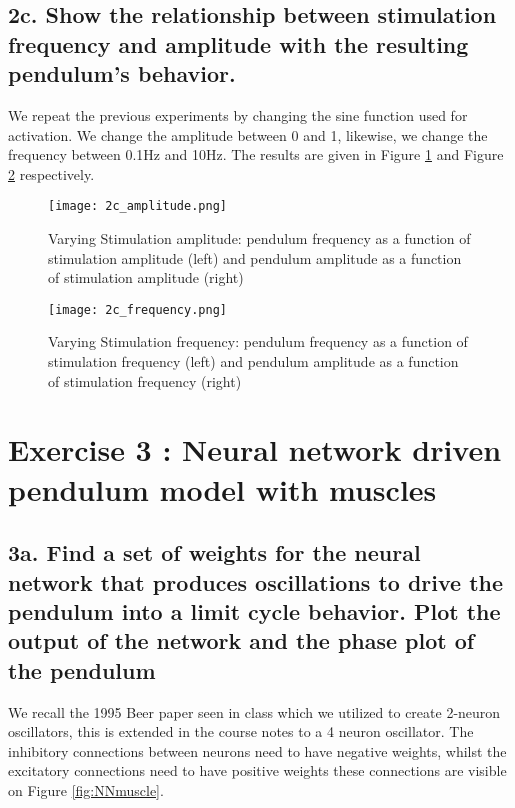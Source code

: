 \documentclass[11pt]{article}
\begin{document}
\label{sec:2c}

\newpage 
\subsection*{2c. Show the relationship between stimulation
  frequency and amplitude with the resulting pendulum's behavior.}
We repeat the previous experiments by changing the sine function used for activation. We change the amplitude between 0 and 1, likewise, we change the frequency between 0.1Hz and 10Hz. The results are given in Figure \ref{fig:varying_amplitude} and Figure \ref{fig:varying_frequency} respectively. 
  
  
\label{sec:2e}
\begin{figure}[!h]
\centering
\texttt{[image: 2c\_amplitude.png]}

\caption{Varying Stimulation amplitude: pendulum frequency as a function of stimulation amplitude (left) and pendulum amplitude as a function of  stimulation amplitude (right)}
\label{fig:varying_amplitude}
\end{figure}
\newpage 
\begin{figure}[!h]
\centering
\texttt{[image: 2c\_frequency.png]} 

\caption{Varying Stimulation frequency: pendulum frequency as a function of stimulation frequency (left) and pendulum amplitude as a function of  stimulation frequency (right)}
\label{fig:varying_frequency}
\end{figure}  

\newpage
\section*{Exercise 3 : Neural network driven pendulum model with
  muscles}
\label{sec:neur-netw-driv}

\subsection*{3a. Find a set of weights for the neural network that
  produces oscillations to drive the pendulum into a limit cycle
  behavior. Plot the output of the network and the phase plot of
the pendulum}
\label{sec:4a}

We recall the 1995 Beer paper seen in class which we utilized to create 2-neuron oscillators, this is extended in the course notes to a 4 neuron oscillator. The inhibitory connections between neurons need to have negative weights, whilst the excitatory connections need to have positive weights these connections are visible on Figure \ref{fig:NNmuscle}.
\end{document}

